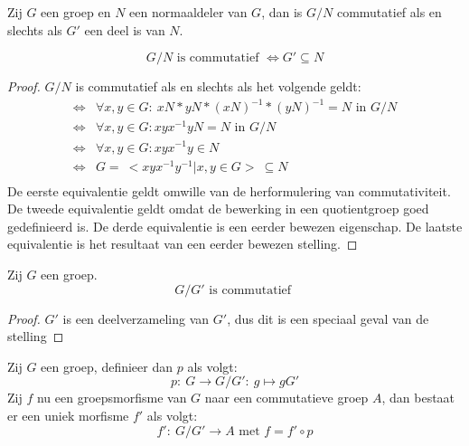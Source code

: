 \documentclass[main.tex]{subfiles}
\begin{document}
\begin{st}
  Zij $G$ een groep en $N$ een normaaldeler van $G$, dan is $G/N$ commutatief als en slechts als $G'$ een deel is van $N$.

  \[ G/N \text{ is commutatief } \Leftrightarrow G' \subseteq N \]

  \begin{proof}
    $G/N$ is commutatief als en slechts als het volgende geldt:
    \[
    \begin{array}{rl}
      \Leftrightarrow & \forall x,y \in G:\ xN * yN * (xN)^{-1} * (yN)^{-1} = N \text{ in }G/N\\
      \Leftrightarrow & \forall x,y \in G: xyx^{-1}yN = N \text{ in } G/N\\
      \Leftrightarrow & \forall x,y \in G: xyx^{-1}y \in N\\
      \Leftrightarrow & G =\ < xyx^{-1}y^{-1} | x,y \in G >\ \subseteq N\\ 
    \end{array}
    \]
    De eerste equivalentie geldt omwille van de herformulering van commutativiteit.
    De tweede equivalentie geldt omdat de bewerking in een quotientgroep goed gedefinieerd is.
    De derde equivalentie is een eerder bewezen eigenschap.
    De laatste equivalentie is het resultaat van een eerder bewezen stelling.
  \end{proof}
\end{st}

\begin{gev}
 \label{gev:afgeleide-door-groep-is-commutatief}
  Zij $G$ een groep.
  \[ G/G' \text{ is commutatief } \]

  \begin{proof}
    $G'$ is een deelverzameling van $G'$, dus dit is een speciaal geval van de stelling
  \end{proof}
\end{gev}

\begin{st}
  Zij $G$ een groep, definieer dan $p$ als volgt:
  \[ p:\ G \rightarrow G/G':\ g \mapsto gG' \]
  Zij $f$ nu een groepsmorfisme van $G$ naar een commutatieve groep $A$, dan bestaat er een uniek morfisme $f'$ als volgt:
  \[ f':\ G/G' \rightarrow A \text{ met } f = f'\circ p \]
\end{st}
\end{document}

